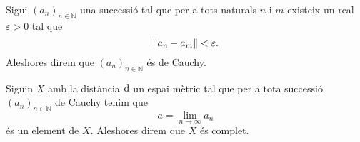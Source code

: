 \documentclass[../Apunts.tex]{subfiles}
\begin{document}
	\begin{definition}
		\label{def:successió de Cauchy amb normes}
		Sigui \((a_{n})_{n\in\mathbb{N}}\) una successió tal que per a tots naturals \(n\) i \(m\) existeix un real \(\varepsilon>0\) tal que
		\[\norm{a_{n}-a_{m}}<\varepsilon.\]
		Aleshores direm que \((a_{n})_{n\in\mathbb{N}}\) és de Cauchy.
	\end{definition}
	\begin{definition}
		\label{def:espai mètric complet}
		Siguin \(X\) amb la distància \(\operatorname{d}\) un espai mètric tal que per a tota successió \((a_{n})_{n\in\mathbb{N}}\) de Cauchy tenim que
		\[a=\lim_{n\to\infty}a_{n}\]
		és un element de \(X\). Aleshores direm que \(X\) és complet.
	\end{definition}
\end{document}

